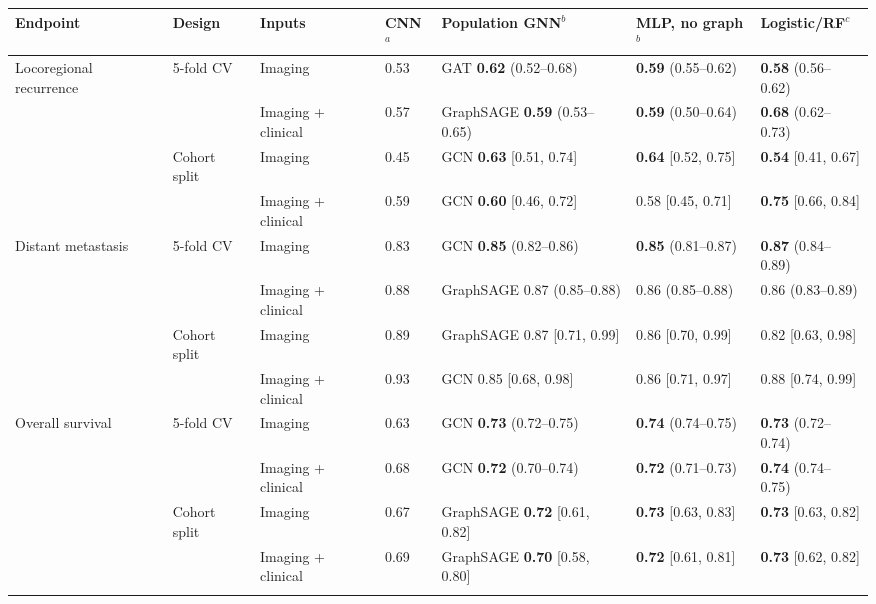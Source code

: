 \begin{tabular}{@{}lllllll@{}}
\toprule
Endpoint & Design & Inputs & CNN$^{a}$ & Population GNN$^{b}$ & MLP, no graph$^{b}$ & Logistic/RF$^{c}$ \\
\midrule
Locoregional recurrence & 5-fold CV & Imaging & 0.53 & GAT \textbf{0.62} (0.52--0.68) & \textbf{0.59} (0.55--0.62) & \textbf{0.58} (0.56--0.62) \\
 &  & Imaging + clinical & 0.57 & GraphSAGE \textbf{0.59} (0.53--0.65) & \textbf{0.59} (0.50--0.64) & \textbf{0.68} (0.62--0.73) \\
 & Cohort split & Imaging & 0.45 & GCN \textbf{0.63} [0.51, 0.74] & \textbf{0.64} [0.52, 0.75] & \textbf{0.54} [0.41, 0.67] \\
 &  & Imaging + clinical & 0.59 & GCN \textbf{0.60} [0.46, 0.72] & 0.58 [0.45, 0.71] & \textbf{0.75} [0.66, 0.84] \\
\midrule
Distant metastasis & 5-fold CV & Imaging & 0.83 & GCN \textbf{0.85} (0.82--0.86) & \textbf{0.85} (0.81--0.87) & \textbf{0.87} (0.84--0.89) \\
 &  & Imaging + clinical & 0.88 & GraphSAGE 0.87 (0.85--0.88) & 0.86 (0.85--0.88) & 0.86 (0.83--0.89) \\
 & Cohort split & Imaging & 0.89 & GraphSAGE 0.87 [0.71, 0.99] & 0.86 [0.70, 0.99] & 0.82 [0.63, 0.98] \\
 &  & Imaging + clinical & 0.93 & GCN 0.85 [0.68, 0.98] & 0.86 [0.71, 0.97] & 0.88 [0.74, 0.99] \\
\midrule
Overall survival & 5-fold CV & Imaging & 0.63 & GCN \textbf{0.73} (0.72--0.75) & \textbf{0.74} (0.74--0.75) & \textbf{0.73} (0.72--0.74) \\
 &  & Imaging + clinical & 0.68 & GCN \textbf{0.72} (0.70--0.74) & \textbf{0.72} (0.71--0.73) & \textbf{0.74} (0.74--0.75) \\
 & Cohort split & Imaging & 0.67 & GraphSAGE \textbf{0.72} [0.61, 0.82] & \textbf{0.73} [0.63, 0.83] & \textbf{0.73} [0.63, 0.82] \\
 &  & Imaging + clinical & 0.69 & GraphSAGE \textbf{0.70} [0.58, 0.80] & \textbf{0.72} [0.61, 0.81] & \textbf{0.73} [0.62, 0.82] \\
\botrule
\end{tabular}
